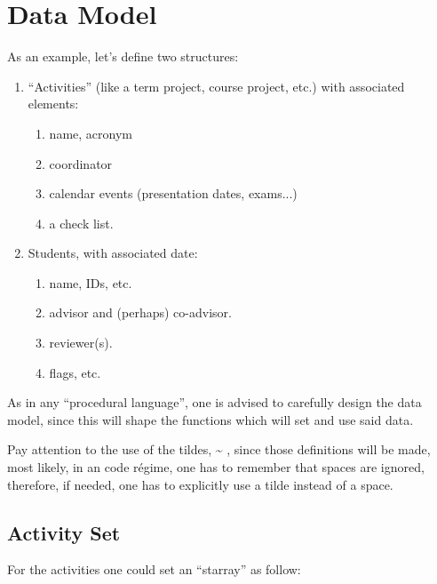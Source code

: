 \documentclass[10pt]{article}
\begin{document}
\section{Data Model}\label{DataModel}
As an example, let's define two structures:
\begin{enumerate}
  \item ``Activities'' (like a term project, course project, etc.)  with associated 
elements: 
\begin{enumerate}
  \item name, acronym
  \item coordinator
  \item calendar events (presentation dates, exams...)
  \item a check list.
\end{enumerate}

  \item Students, with associated date:
\begin{enumerate}
  \item name, IDs, etc.
  \item advisor and (perhaps) co-advisor.
  \item reviewer(s).
  \item flags, etc.
\end{enumerate}
  
  
\end{enumerate}

\begin{tsremark}
As in any ``procedural language'', one is advised to  carefully design the data model, since this will shape the functions which will set and use said data.
\end{tsremark}

\begin{tsremark}
  Pay attention to the use of the tildes,  \~{} , since those definitions will be made, most likely, in an  code régime, one has to remember that spaces are ignored, therefore, if needed, one has to explicitly use a tilde instead of a space.
\end{tsremark}


\subsection{Activity Set}\label{Activity:DataModel}
For the activities one could set an ``starray'' as follow:
\end{document}
